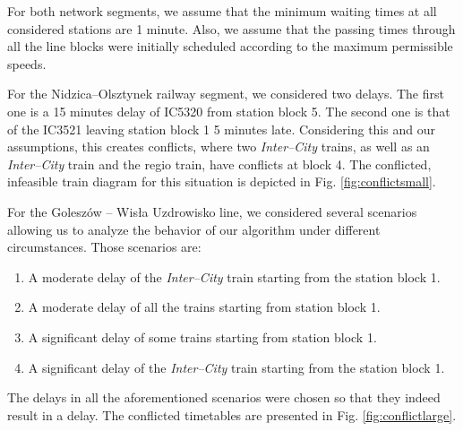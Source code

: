 For both network segments, we assume that the minimum waiting times at all
considered stations are 1 minute. Also, we assume that the passing times
through all the line blocks were initially scheduled according to the maximum
permissible speeds.

For the Nidzica--Olsztynek railway segment, we considered two delays. The first
one is a 15 minutes delay of IC5320 from station block 5. The second one is
that of the IC3521 leaving station block 1 5 minutes late. Considering this and
our assumptions, this creates conflicts, where two \emph{Inter--City} trains,
as well as an \emph{Inter--City} train and the regio train, have conflicts at
block 4. The conflicted, infeasible train diagram for this situation is
depicted in Fig. \ref{fig:conflictsmall}.

For the Goleszów -- Wisła Uzdrowisko line, we considered several scenarios
allowing us to analyze the behavior of our algorithm under different
circumstances. Those scenarios are:

\begin{enumerate}
  \item A moderate delay of the \emph{Inter--City} train starting from the station
    block 1.
  \item A moderate delay of all the trains starting from station block 1.
  \item A significant delay of some trains starting from station block 1.
  \item A significant delay of the \emph{Inter--City} train starting from the station
    block 1.
\end{enumerate}

The delays in all the aforementioned scenarios were chosen so that they indeed
result in a delay. The conflicted timetables are presented in Fig.
\ref{fig:conflictlarge}.

